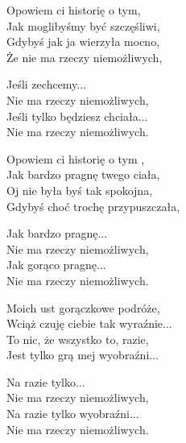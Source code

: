 \begin{text}
    Opowiem ci historię o tym,\\
    Jak moglibyśmy być szczęśliwi,\\
    Gdybyś jak ja wierzyła mocno,\\
    Że nie ma rzeczy niemożliwych,

    Jeśli zechcemy...\\
    Nie ma rzeczy niemożliwych,\\
    Jeśli tylko będziesz chciała...\\
    Nie ma rzeczy niemożliwych.

    Opowiem ci historię o tym ,\\
    Jak bardzo pragnę twego ciała,\\
    Oj nie była byś tak spokojna,\\
    Gdybyś choć trochę przypuszczała,

    Jak bardzo pragnę...\\
    Nie ma rzeczy niemożliwych,\\
    Jak gorąco pragnę...\\
    Nie ma rzeczy niemożliwych.

    Moich ust gorączkowe podróże,\\
    Wciąż czuję ciebie tak wyraźnie...\\
    To nic, że wszystko to, razie,\\
    Jest tylko grą mej wyobraźni...

    Na razie tylko...\\
    Nie ma rzeczy niemożliwych,\\
    Na razie tylko wyobraźni...\\
    Nie ma rzeczy niemożliwych.
\end{text}
\begin{chord}

\end{chord}